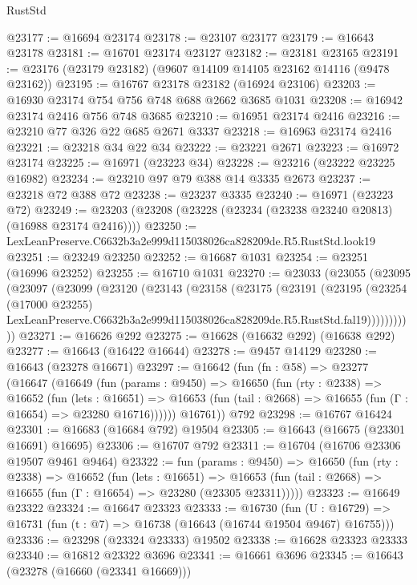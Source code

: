 \begin{lexlean}{RustStd}
\begin{coremodule}
@23177 := @16694 @23174
@23178 := @23107 @23177
@23179 := @16643 @23178
@23181 := @16701 @23174 @23127
@23182 := @23181 @23165
@23191 := @23176 (@23179 @23182) (@9607 @14109 @14105 @23162 @14116 (@9478 @23162))
@23195 := @16767 @23178 @23182 (@16924 @23106)
@23203 := @16930 @23174 @754 @756 @748 @688 @2662 @3685 @1031
@23208 := @16942 @23174 @2416 @756 @748 @3685
@23210 := @16951 @23174 @2416
@23216 := @23210 @77 @326 @22 @685 @2671 @3337
@23218 := @16963 @23174 @2416
@23221 := @23218 @34 @22 @34
@23222 := @23221 @2671
@23223 := @16972 @23174
@23225 := @16971 (@23223 @34)
@23228 := @23216 (@23222 @23225 @16982)
@23234 := @23210 @97 @79 @388 @14 @3335 @2673
@23237 := @23218 @72 @388 @72
@23238 := @23237 @3335
@23240 := @16971 (@23223 @72)
@23249 := @23203 (@23208 (@23228 (@23234 (@23238 @23240 @20813) (@16988 @23174 @2416))))
@23250 := LexLeanPreserve.C6632b3a2e999d115038026ca828209de.R5.RustStd.look19
@23251 := @23249 @23250
@23252 := @16687 @1031
@23254 := @23251 (@16996 @23252)
@23255 := @16710 @1031
@23270 := @23033
    (@23055
      (@23095
        (@23097
          (@23099
            (@23120
              (@23143
                (@23158
                  (@23175
                    (@23191
                      (@23195
                        (@23254
                          (@17000 @23255)
                          LexLeanPreserve.C6632b3a2e999d115038026ca828209de.R5.RustStd.fal19)))))))))))
@23271 := @16626 @292
@23275 := @16628 (@16632 @292) (@16638 @292)
@23277 := @16643 (@16422 @16644)
@23278 := @9457 @14129
@23280 := @16643 (@23278 @16671)
@23297 := @16642
    (fun (fn : @58) =>
    @23277
      (@16647
        (@16649
          (fun (params : @9450) =>
          @16650
            (fun (rty : @2338) =>
            @16652
              (fun (lets : @16651) =>
              @16653 (fun (tail : @2668) => @16655 (fun (Γ : @16654) => @23280 @16716))))))
        @16761))
    @792
@23298 := @16767 @16424
@23301 := @16683 (@16684 @792) @19504
@23305 := @16643 (@16675 (@23301 @16691) @16695)
@23306 := @16707 @792
@23311 := @16704 (@16706 @23306 @19507 @9461 @9464)
@23322 := fun (params : @9450) =>
  @16650
    (fun (rty : @2338) =>
    @16652
      (fun (lets : @16651) =>
      @16653 (fun (tail : @2668) => @16655 (fun (Γ : @16654) => @23280 (@23305 @23311)))))
@23323 := @16649 @23322
@23324 := @16647 @23323
@23333 := @16730
    (fun (U : @16729) => @16731 (fun (t : @7) => @16738 (@16643 (@16744 @19504 @9467) @16755)))
@23336 := @23298 (@23324 @23333) @19502
@23338 := @16628 @23323 @23333
@23340 := @16812 @23322 @3696
@23341 := @16661 @3696
@23345 := @16643 (@23278 (@16660 (@23341 @16669)))

\end{coremodule}
\end{lexlean}
